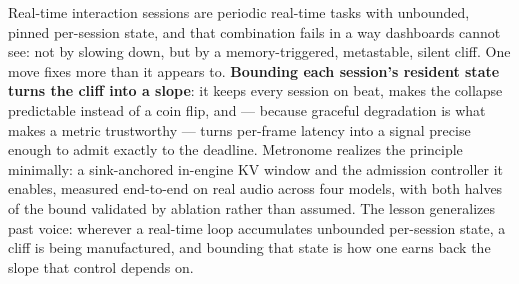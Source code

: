 Real-time interaction sessions are periodic real-time tasks with unbounded, pinned per-session state,
and that combination fails in a way dashboards cannot see: not by slowing down, but by a memory-triggered,
metastable, silent cliff. One move fixes more than it appears to. \textbf{Bounding each session's
resident state turns the cliff into a slope}: it keeps every session on beat, makes the collapse
predictable instead of a coin flip, and --- because graceful degradation is what makes a metric
trustworthy --- turns per-frame latency into a signal precise enough to admit exactly to the deadline.
Metronome realizes the principle minimally: a sink-anchored in-engine KV window and the admission
controller it enables, measured end-to-end on real audio across four models, with both halves of the
bound validated by ablation rather than assumed. The lesson generalizes past voice: wherever a real-time loop accumulates unbounded
per-session state, a cliff is being manufactured, and bounding that state is how one earns back the slope
that control depends on.
